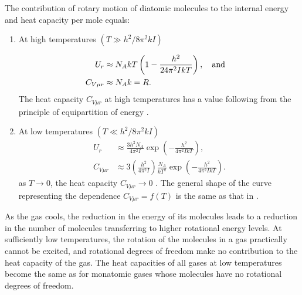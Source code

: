 The contribution of rotary motion of diatomic molecules to the internal energy and heat capacity per mole equals:
\begin{enumerate}[label=(\alph*)]
\item At high temperatures $(T \gg h^{2}/8\pi^{2}kI)$

\begin{align*}%
U_{r} & \approx N_{A} kT \left(1 -  \frac{h^{2}}{24\pi^{2}I kT} \right), \qand \\ 
C_{V \mu r} & \approx N_{A}k = R.
\end{align*}
The heat capacity $C_{V \mu r}$ at high temperatures has a value following from the principle of equipartition of energy . 
\item At low temperatures $(T \ll h^{2}/8\pi^{2}kI)$
\begin{align*}%
U_{r} & \approx \frac{3 h^{2} N_{A}}{4 \pi^{2} I} \exp \left(- \frac{h^{2}}{4\pi^{2}I kT} \right),  \\
C_{V \mu r} & \approx 3 \left( \frac{h^{2}}{4 \pi^{2}I} \right) \frac{N_{A}}{kT^{2}} \exp \left(- \frac{h^{2}}{4\pi^{2}I kT} \right).
\end{align*}
as $T \to 0$, the heat capacity $ C_{V \mu r} \to 0$ . The general shape of the curve representing the dependence $C_{V \mu r} = f (T)$ is the same as that in .
\end{enumerate}

As the gas cools, the reduction in the energy of its molecules leads to a reduction in the number of molecules transferring to higher rotational energy levels. At sufficiently low tem­peratures, the rotation of the molecules in a gas practically cannot be excited, and rotational degrees of freedom make no contribution to the heat capacity of the gas. The heat capa­cities of all gases at low temperatures become the same as for monatomic gases whose molecules have no rotational degrees of freedom.


